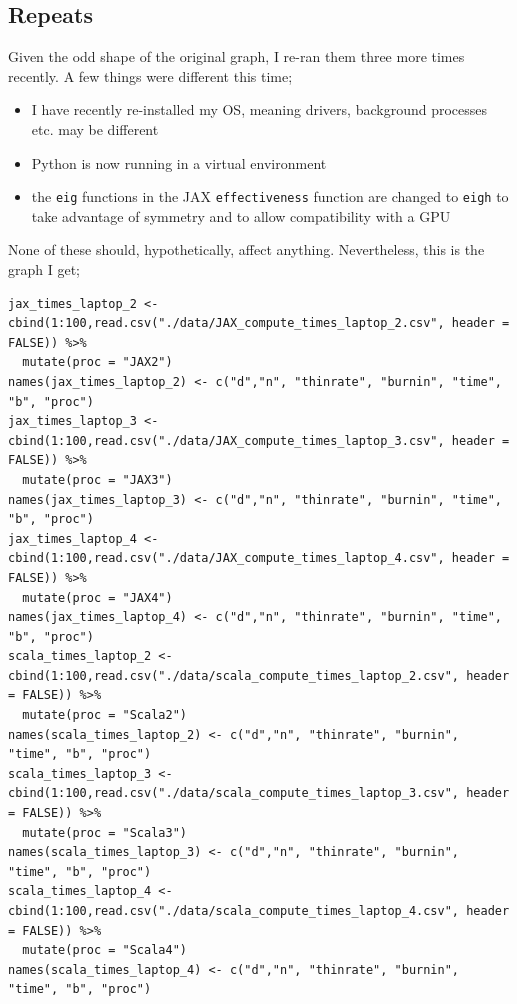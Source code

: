 \documentclass[letterpaper]{article}
\begin{document}
\subsection{Repeats}
\label{sec:org45794b3}

Given the odd shape of the original graph, I re-ran them three more times recently. A few things were different this time;
\begin{itemize}
\item I have recently re-installed my OS, meaning drivers, background processes etc. may be different
\item Python is now running in a virtual environment
\item the \texttt{eig} functions in the JAX \texttt{effectiveness} function are changed to \texttt{eigh} to take advantage of symmetry and to allow compatibility with a GPU
\end{itemize}

None of these should, hypothetically, affect anything. Nevertheless, this is the graph I get;

\begin{verbatim}
jax_times_laptop_2 <- cbind(1:100,read.csv("./data/JAX_compute_times_laptop_2.csv", header = FALSE)) %>%
  mutate(proc = "JAX2")
names(jax_times_laptop_2) <- c("d","n", "thinrate", "burnin", "time", "b", "proc")
jax_times_laptop_3 <- cbind(1:100,read.csv("./data/JAX_compute_times_laptop_3.csv", header = FALSE)) %>%
  mutate(proc = "JAX3")
names(jax_times_laptop_3) <- c("d","n", "thinrate", "burnin", "time", "b", "proc")
jax_times_laptop_4 <- cbind(1:100,read.csv("./data/JAX_compute_times_laptop_4.csv", header = FALSE)) %>%
  mutate(proc = "JAX4")
names(jax_times_laptop_4) <- c("d","n", "thinrate", "burnin", "time", "b", "proc")
scala_times_laptop_2 <- cbind(1:100,read.csv("./data/scala_compute_times_laptop_2.csv", header = FALSE)) %>%
  mutate(proc = "Scala2")
names(scala_times_laptop_2) <- c("d","n", "thinrate", "burnin", "time", "b", "proc")
scala_times_laptop_3 <- cbind(1:100,read.csv("./data/scala_compute_times_laptop_3.csv", header = FALSE)) %>%
  mutate(proc = "Scala3")
names(scala_times_laptop_3) <- c("d","n", "thinrate", "burnin", "time", "b", "proc")
scala_times_laptop_4 <- cbind(1:100,read.csv("./data/scala_compute_times_laptop_4.csv", header = FALSE)) %>%
  mutate(proc = "Scala4")
names(scala_times_laptop_4) <- c("d","n", "thinrate", "burnin", "time", "b", "proc")
\end{verbatim}
\end{document}
